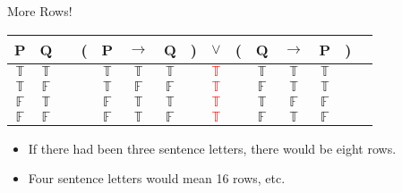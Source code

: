 \documentclass[
  ignorenonframetext,
]{beamer}
\providecommand{\tightlist}{%
  \setlength{\itemsep}{0pt}\setlength{\parskip}{0pt}}
\renewcommand{\,}{\text{, }}
\def\True{\mathbb{T}}
\def\False{\mathbb{F}}
\begin{document}
\begin{frame}{More Rows!}
\protect\hypertarget{more-rows}{}

\begin{center}
\begin{tabular}{@{ }c@{ }@{ }c | c@{ }@{}c@{}@{ }c@{ }@{ }c@{ }@{ }c@{ }@{}c@{}@{ }c@{ }@{}c@{}@{ }c@{ }@{ }c@{ }@{ }c@{ }@{}c@{}@{ }c}
P & Q &  & ( & P & $\rightarrow$ & Q & ) & $\lor$ & ( & Q & $\rightarrow$ & P & ) & \\
\hline 
$\True$ & $\True$ &  &  & $\True$ & $\True$ & $\True$ &  & \textcolor{red}{$\True$} &  & $\True$ & $\True$ & $\True$ &  & \\
$\True$ & $\False$ &  &  & $\True$ & $\False$ & $\False$ &  & \textcolor{red}{$\True$} &  & $\False$ & $\True$ & $\True$ &  & \\
$\False$ & $\True$ &  &  & $\False$ & $\True$ & $\True$ &  & \textcolor{red}{$\True$} &  & $\True$ & $\False$ & $\False$ &  & \\
$\False$ & $\False$ &  &  & $\False$ & $\True$ & $\False$ &  & \textcolor{red}{$\True$} &  & $\False$ & $\True$ & $\False$ &  & \\
\end{tabular}
\bigskip
\end{center}

\begin{itemize}
\tightlist
\item
  If there had been three sentence letters, there would be eight rows.
\item
  Four sentence letters would mean 16 rows, etc.
\end{itemize}

\end{frame}
\end{document}
